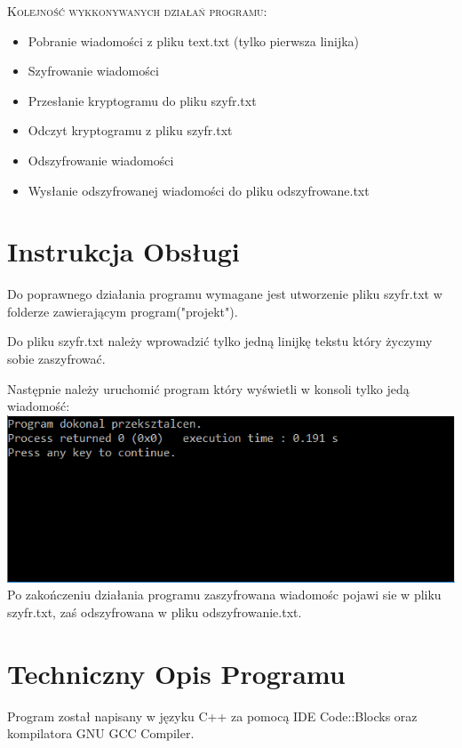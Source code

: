 \documentclass{article}
\begin{document}
\textsc{\large Kolejność wykkonywanych działań programu:}
\begin{itemize}
\item Pobranie wiadomości z pliku text.txt (tylko pierwsza linijka)
\item Szyfrowanie wiadomości
\item Przesłanie kryptogramu do pliku szyfr.txt
\item Odczyt kryptogramu z pliku szyfr.txt
\item Odszyfrowanie wiadomości
\item Wysłanie odszyfrowanej wiadomości do pliku odszyfrowane.txt
\end{itemize}


\newpage

\section{Instrukcja Obsługi}
Do poprawnego działania programu wymagane jest utworzenie pliku szyfr.txt w folderze zawierającym program("projekt").

Do pliku szyfr.txt należy wprowadzić tylko jedną linijkę tekstu który życzymy sobie zaszyfrować.

Następnie należy uruchomić program który wyświetli w konsoli tylko jedą wiadomość:\\

\includegraphics{message}\\

Po zakończeniu działania programu zaszyfrowana wiadomośc pojawi sie w pliku szyfr.txt, zaś odszyfrowana w pliku odszyfrowanie.txt.

\cleardoublepage

\section{Techniczny Opis Programu}

Program został napisany w języku C++ za pomocą IDE Code::Blocks oraz kompilatora GNU GCC Compiler.
\end{document}
